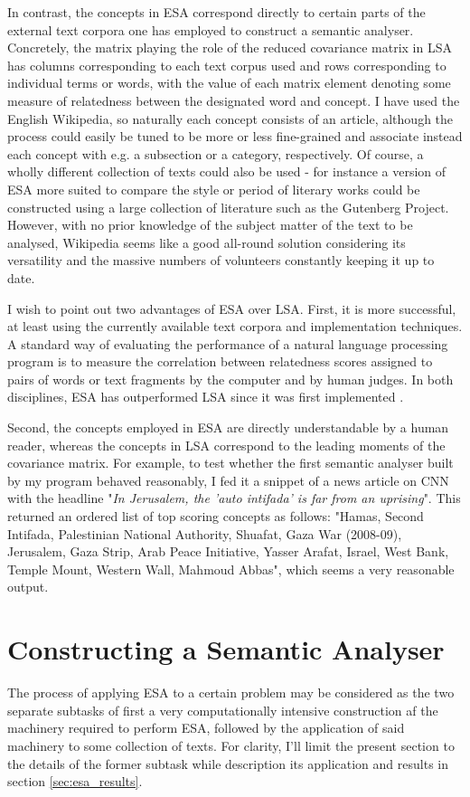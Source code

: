 In contrast, the concepts in ESA correspond directly to certain parts of the external text corpora one has employed to construct a semantic analyser. Concretely, the matrix playing the role of the reduced covariance matrix in LSA has columns corresponding to each text corpus used and rows corresponding to individual terms or words, with the value of each matrix element denoting some measure of relatedness between the designated word and concept. I have used the English Wikipedia, so naturally each concept consists of an article, although the process could easily be tuned to be more or less fine-grained and associate instead each concept with e.g. a subsection or a category, respectively. Of course, a wholly different collection of texts could also be used - for instance a version of ESA more suited to compare the style or period of literary works could be constructed using a large collection of literature such as the Gutenberg Project. However, with no prior knowledge of the subject matter of the text to be analysed, Wikipedia seems like a good all-round solution considering its versatility and the massive numbers of volunteers constantly keeping it up to date.

I wish to point out two advantages of ESA over LSA. First, it is more successful, at least using the currently available text corpora and implementation techniques. A standard way of evaluating the performance of a natural language processing program is to measure the correlation between relatedness scores assigned to pairs of words or text fragments by the computer and by human judges. In both disciplines, ESA has outperformed LSA since it was first implemented .

Second, the concepts employed in ESA are directly understandable by a human reader, whereas the concepts in LSA correspond to the leading moments of the covariance matrix. For example, to test whether the first semantic analyser built by my program behaved reasonably, I fed it a snippet of a news article on CNN with the headline "\textit{In Jerusalem, the 'auto intifada' is far from an uprising}". This returned an ordered list of top scoring concepts as follows:
"Hamas, Second Intifada, Palestinian National Authority, Shuafat, Gaza War (2008-09), Jerusalem, Gaza Strip, Arab Peace Initiative, Yasser Arafat, Israel, West Bank, Temple Mount, Western Wall, Mahmoud Abbas", which seems a very reasonable output.

\section{Constructing a Semantic Analyser}
The process of applying ESA to a certain problem may be considered as the two separate subtasks of first a very computationally intensive construction af the machinery required to perform ESA, followed by the application of said machinery to some collection of texts. For clarity, I'll limit the present section to the details of the former subtask while description its application and results in section \ref{sec:esa_results}.

